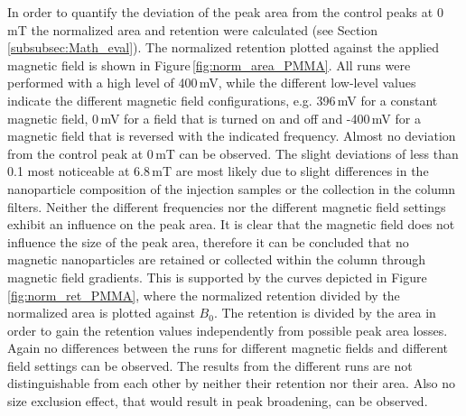 In order to quantify the deviation of the peak area from the control peaks at 0\,mT the normalized area and retention were calculated (see Section\,\ref{subsubsec:Math_eval}). The normalized retention plotted against the applied magnetic field is shown in Figure\,\ref{fig:norm_area_PMMA}. All runs were performed with a high level of 400\,mV, while the different low-level values indicate the different magnetic field configurations, e.g. 396\,mV for a constant magnetic field, 0\,mV for a field that is turned on and off and -400\,mV for a magnetic field that is reversed with the indicated frequency. Almost no deviation from the control peak at 0\,mT can be observed. The slight deviations of less than 0.1 most noticeable at 6.8\,mT are most likely due to slight differences in the nanoparticle composition of the injection samples or the collection in the column filters. Neither the different frequencies nor the different magnetic field settings exhibit an influence on the peak area. It is clear that the magnetic field does not influence the size of the peak area, therefore it can be concluded that no magnetic nanoparticles are retained or collected within the column through magnetic field gradients. This is supported by the curves depicted in Figure\,\ref{fig:norm_ret_PMMA}, where the normalized retention divided by the normalized area is plotted against $B_{0}$. The retention is divided by the area in order to gain the retention values independently from possible peak area losses. Again no differences between the runs for different magnetic fields and different field settings can be observed. The results from the different runs are not distinguishable from each other by neither their retention nor their area. Also no size exclusion effect, that would result in peak broadening, can be observed.
\FloatBarrier
